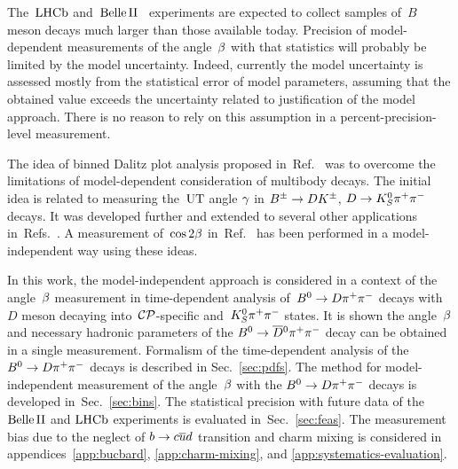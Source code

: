 \documentclass[a4paper,11pt]{article}
\begin{document}
The~$\mathrm{LHCb}$ and~$\mathrm{Belle}\,\mathrm{II}$~\cite{belleII} experiments are expected to collect 
samples of~$B$ meson decays much larger than those available today.  Precision 
of model-dependent measurements of the angle~$\beta$ with that statistics will 
probably be limited by the model uncertainty.  Indeed, currently the model 
uncertainty is assessed mostly from the statistical error of model parameters, 
assuming that the obtained value exceeds the uncertainty related to justification 
of the model approach.  There is no reason to rely on this assumption in a 
percent-precision-level measurement.

The idea of binned Dalitz plot analysis proposed in~Ref.~\cite{GGSZ} was 
to overcome the limitations of model-dependent consideration of 
multibody decays. The initial idea is related to measuring the~$\mathrm{UT}$ angle 
$\gamma$ in $B^{\pm}\to DK^{\pm}$, $D\to K_S^0\pi^+\pi^-$ decays.  It was developed further and extended 
to several other applications in~Refs.~\cite{BP_phi3_model1,BP_phi3_model2,BPV,dd,hr1,hr2,BDKpiModInd,UnbinnedModInd}.  
A measurement of~$\cos{2\beta}$ in~Ref.~\cite{cosbeta_belle} has been performed 
in a model-independent way using these ideas.

In this work, the model-independent approach is considered in a context of
the angle~$\beta$ measurement in time-dependent analysis of~$B^0\to D\pi^+\pi^-$ decays 
with~$D$ meson decaying into~$\mathcal{CP}$-specific and~$K_S^0\pi^+\pi^-$ states.  
It is shown the angle~$\beta$ and necessary hadronic parameters 
of the $B^0\to\overline{D}{}^0\pi^+\pi^-$ decay can be obtained in a single measurement.  Formalism of the 
time-dependent analysis of the $B^0\to D\pi^+\pi^-$ decays is described in Sec.~\ref{sec:pdfs}.  
The method for model-independent measurement of the angle~$\beta$ with the $B^0\to D\pi^+\pi^-$ 
decays is developed in~Sec.~\ref{sec:bins}.  The statistical precision 
with future data of the $\mathrm{Belle}\,\mathrm{II}$ and $\mathrm{LHCb}$ experiments 
is evaluated in~Sec.~\ref{sec:feas}.  The measurement bias due to the neglect of 
$b\to c\overline{u}d$ transition and charm mixing is considered in appendices~\ref{app:bucbard}, 
\ref{app:charm-mixing}, and \ref{app:systematics-evaluation}.
\end{document}
